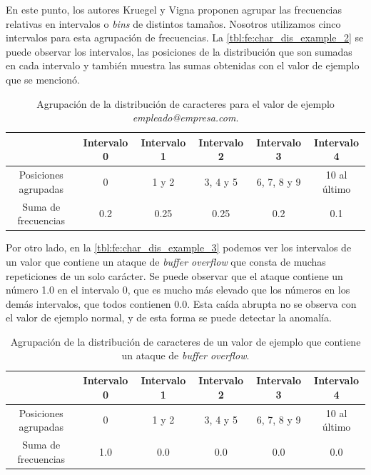 En este punto, los autores Kruegel y Vigna proponen agrupar las frecuencias
relativas en intervalos o \textit{bins} de distintos tamaños.
Nosotros utilizamos cinco intervalos para esta agrupación de frecuencias.
La \autoref{tbl:fe:char_dis_example_2} se puede observar los intervalos,
las posiciones de la distribución que son sumadas en cada intervalo y
también muestra las sumas obtenidas con el valor de ejemplo que se mencionó.

\begin{table}[ht]
    \centering
    \small
    \begin{tabularx}{\linewidth}{C|c|c|c|c|c}
                             & Intervalo 0 & Intervalo 1 & Intervalo 2 & Intervalo 3 & Intervalo 4 \\ \hline
        Posiciones agrupadas & 0           & 1 y 2       & 3, 4 y 5    & 6, 7, 8 y 9 & 10 al último \\ \hline
        Suma de frecuencias  & \num{0.2}   & \num{0.25}  & \num{0.25}  & \num{0.2}   & \num{0.1}
    \end{tabularx}

    \caption{Agrupación de la distribución de caracteres para el valor
        de ejemplo \textit{empleado@empresa.com}.}
    \label{tbl:fe:char_dis_example_2}
\end{table}

Por otro lado, en la \autoref{tbl:fe:char_dis_example_3} podemos ver los
intervalos de un valor que contiene un ataque de \textit{buffer overflow}
que consta de muchas repeticiones de un solo carácter. Se puede observar
que el ataque contiene un número \num{1.0} en el intervalo 0, que es
mucho más elevado que los números en los demás intervalos, que todos
contienen \num{0.0}. Esta caída abrupta no se observa con el valor de
ejemplo normal, y de esta forma se puede detectar la anomalía.

\begin{table}[ht]
    \centering
    \small
    \begin{tabularx}{\linewidth}{C|c|c|c|c|c}
                             & Intervalo 0 & Intervalo 1 & Intervalo 2 & Intervalo 3 & Intervalo 4 \\ \hline
        Posiciones agrupadas & 0           & 1 y 2       & 3, 4 y 5    & 6, 7, 8 y 9 & 10 al último \\ \hline
        Suma de frecuencias  & \num{1.0}   & \num{0.0}   & \num{0.0}   & \num{0.0}   & \num{0.0}
    \end{tabularx}

    \caption{Agrupación de la distribución de caracteres de un valor de
        ejemplo que contiene un ataque de \textit{buffer overflow}.}
    \label{tbl:fe:char_dis_example_3}
\end{table}

